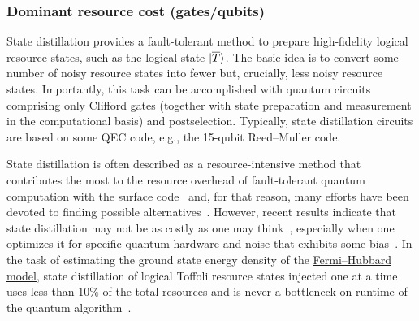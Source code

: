 \begin{refsection}

\subsubsection*{Dominant resource cost (gates/qubits)}


State distillation provides a fault-tolerant method to prepare high-fidelity logical resource states, such as the logical state $\lvert\overline T\rangle$.
The basic idea is to convert some number of noisy resource states into fewer but, crucially, less noisy resource states.
Importantly, this task can be accomplished with quantum circuits comprising only Clifford gates (together with state preparation and measurement in the computational basis) and postselection.
Typically, state distillation circuits are based on some QEC code, e.g., the 15-qubit Reed--Muller code.

State distillation is often described as a resource-intensive method that contributes the most to the resource overhead of fault-tolerant quantum computation with the surface code~\cite{fowler2012SurfaceCodes} and, for that reason, many efforts have been devoted to finding possible alternatives~\cite{bravyi2015doubledColorCodes,jochymOConnor2016stackedCodes,bombin20182DquantumComputation,chamberland2019faultTolerantMagicStateFlagQubits,beverland2021costUniversality}. 
However, recent results indicate that state distillation may not be as costly as one may think~\cite{litinski2019gameofsurfacecodes,litinski2019magicstate}, especially when one optimizes it for specific quantum hardware and noise that exhibits some bias~\cite{litinski2022activeVolume}.
In the task of estimating the ground state energy density of the \hyperref[appl:FermiHubbard]{Fermi--Hubbard model}, state distillation of logical Toffoli resource states injected one at a time uses less than $10\%$ of the total resources and is never a bottleneck on runtime of the quantum algorithm~\cite{chamberland2022buildingFTQC}.



\end{refsection}
